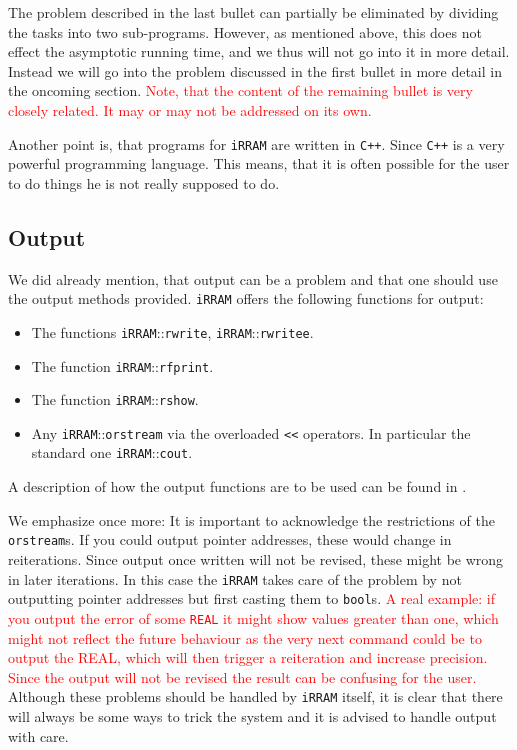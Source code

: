 \documentclass{article}
\newcommand{\irram}{\texttt{iRRAM}\xspace}
\newcommand{\cc}{\texttt{C++}\xspace}
\newcommand{\ir}[1]{\texttt{#1}}
\newcommand{\code}[1]{\texttt{#1}}
\newcommand{\temp}[1]{\textcolor{red}{#1}}
\begin{document}
The problem described in the last bullet can partially be eliminated by dividing the tasks into two sub-programs. However, as mentioned above, this does not effect the asymptotic running time, and we thus will not go into it in more detail. Instead we will go into the problem discussed in the first bullet in more detail in the oncoming section. \temp{Note, that the content of the remaining bullet is very closely related. It may or may not be addressed on its own.}

Another point is, that programs for \irram are written in \cc. Since \cc is a very powerful programming language. This means, that it is often possible for the user to do things he is not really supposed to do.

\subsection{Output}

We did already mention, that output can be a problem and that one should use the output methods provided. \irram offers the following functions for output:
\begin{itemize}
\item The functions \irram::\ir{rwrite}, \irram::\ir{rwritee}.
\item The function \irram::\ir{rfprint}.
\item The function \irram::\ir{rshow}.
\item Any \irram::\ir{orstream} via the overloaded \ir{<<} operators. In particular the standard one \irram::\ir{cout}.
\end{itemize}
A description of how the output functions are to be used can be found in \cite[\temp{Chapter 34.8.}]{Muller2013}.

We emphasize once more: It is important to acknowledge the restrictions of the \ir{orstream}s. If you could output pointer addresses, these would change in reiterations. Since output once written will not be revised, these might be wrong in later iterations. In this case the \irram takes care of the problem by not outputting pointer addresses but first casting them to \code{bool}s. \temp{A real example: if you output the error of some \ir{REAL} it might show values greater than one, which might not reflect the future behaviour as the very next command could be to output the REAL, which will then trigger a reiteration and increase precision. Since the output will not be revised the result can be confusing for the user.} Although these problems should be handled by \irram itself, it is clear that there will always be some ways to trick the system and it is advised to handle output with care.
\end{document}
